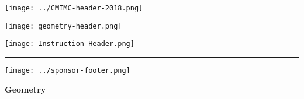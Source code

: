\documentclass[10pt]{article}
\begin{document}
\thispagestyle{empty}
\begin{center}

\vspace*{40pt}

\texttt{[image: ../CMIMC-header-2018.png]}

\texttt{[image: geometry-header.png]}

\vspace{1.4in}

\texttt{[image: Instruction-Header.png]}
\noindent\rule{15.7cm}{2pt}
\end{center}

\vspace{10pt}



\vspace{0.7in}

\begin{center}
\texttt{[image: ../sponsor-footer.png]}
\end{center}
\newpage

\begin{center}
\huge\textbf{Geometry}\normalsize

\vspace{3pt}
\end{center}
\end{document}
